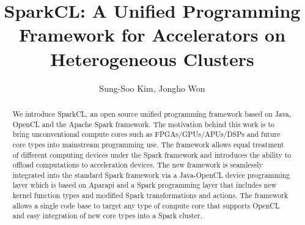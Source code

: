 \documentclass[runningheads,a4paper]{llncs}
\begin{document}
\renewcommand\bibname{References}

\mainmatter  %

\title{SparkCL: A Unified Programming Framework for Accelerators on Heterogeneous Clusters}


%
%
\author{
Sung-Soo Kim, Jongho Won
}

%


%
%

\maketitle


\begin{abstract}
We introduce SparkCL, an open source unified programming framework based on Java, OpenCL and the Apache Spark framework. The motivation behind this work is to bring unconventional compute cores such as FPGAs/GPUs/APUs/DSPs and future core types into mainstream programming use. The framework allows equal treatment of different computing devices under the Spark framework and introduces the ability to offload computations to acceleration devices. The new framework is seamlessly integrated into the standard Spark framework via a Java-OpenCL device programming layer which is based on Aparapi and a Spark programming layer that includes new kernel function types and modified Spark transformations and actions. The framework allows a single code base to target any type of compute core that supports OpenCL and easy integration of new core types into a Spark cluster.

\end{abstract}
\end{document}
